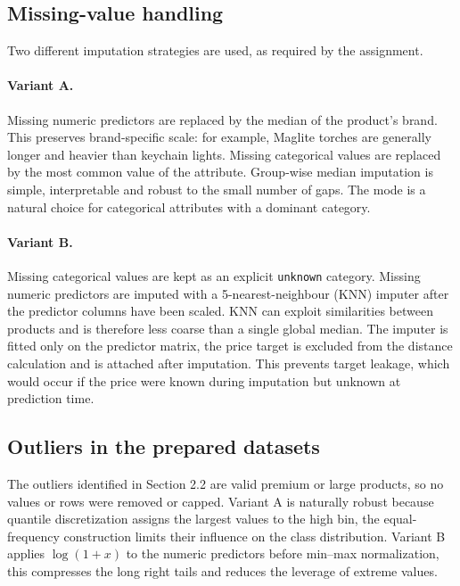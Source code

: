 \documentclass[11pt,a4paper]{article}
\begin{document}
\subsection{Missing-value handling}

Two different imputation strategies are used, as required by the assignment.

\paragraph{Variant A.} Missing numeric predictors are replaced by the median of
the product's brand. This preserves brand-specific scale: for example, Maglite
torches are generally longer and heavier than keychain lights. Missing
categorical values are replaced by the most common value of the attribute.
Group-wise median imputation is simple, interpretable and robust to the small
number of gaps. The mode is a natural choice for categorical attributes with a
dominant category.

\paragraph{Variant B.} Missing categorical values are kept as an explicit
\texttt{unknown} category. Missing numeric predictors are imputed with a
5-nearest-neighbour (KNN) imputer after the predictor columns have been scaled.
KNN can exploit similarities between products and is therefore less coarse than
a single global median. The imputer is fitted only on the predictor matrix, the
price target is excluded from the distance calculation and is attached after
imputation. This prevents target leakage, which would occur if the price were
known during imputation but unknown at prediction time.

\subsection{Outliers in the prepared datasets}

The outliers identified in Section 2.2 are valid premium or large products, so
no values or rows were removed or capped. Variant A is
naturally robust because quantile discretization assigns the largest values to
the high bin, the equal-frequency construction limits their influence on the
class distribution. Variant B applies
\(\log(1+x)\) to the numeric predictors before min--max normalization, this
compresses the long right tails and reduces the leverage of extreme values.
\end{document}
